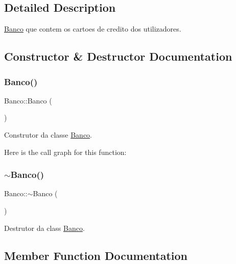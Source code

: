 \subsection{Detailed Description}
\mbox{\hyperlink{class_banco}{Banco}} que contem os cartoes de credito dos utilizadores. 

\subsection{Constructor \& Destructor Documentation}
\mbox{\label{class_banco_a686e51b219dc175e432e91559298b259}} 
\subsubsection{\texorpdfstring{Banco()}{Banco()}}
{\footnotesize\ttfamily Banco\+::\+Banco (\begin{DoxyParamCaption}{ }\end{DoxyParamCaption})}



Construtor da classe \mbox{\hyperlink{class_banco}{Banco}}. 

Here is the call graph for this function\+:
\mbox{\label{class_banco_af69f9b0da3521d7c1e422f21dfd5829e}} 
\subsubsection{\texorpdfstring{$\sim$\+Banco()}{~Banco()}}
{\footnotesize\ttfamily Banco\+::$\sim$\+Banco (\begin{DoxyParamCaption}{ }\end{DoxyParamCaption})}



Destrutor da class \mbox{\hyperlink{class_banco}{Banco}}. 



\subsection{Member Function Documentation}
\mbox{\label{class_banco_a2ac1bb3c6a742743bcbb6dd0a312d74d}} 
